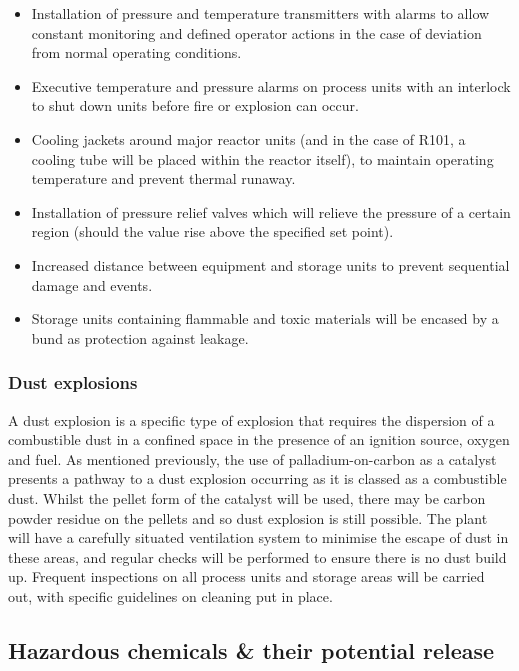\begin{itemize}
\item Installation of pressure and temperature transmitters with alarms to allow constant monitoring and defined operator actions in the case of deviation from normal operating conditions.
         \item Executive temperature and pressure alarms on process units with an interlock to shut down units before fire or explosion can occur. 
         \item Cooling jackets around major reactor units (and in the case of R101, a cooling tube will be placed within the reactor itself), to maintain operating temperature and prevent thermal runaway.
          \item Installation of pressure relief valves which will relieve the pressure of a certain region (should the value rise above the specified set point).
    \item Increased distance between equipment and storage units to prevent sequential damage and events.
    \item Storage units containing flammable and toxic materials will be encased by a bund as protection against leakage.
\end{itemize}


\subsubsection{Dust explosions}

A dust explosion is a specific type of explosion that requires the dispersion of a combustible dust in a confined space in the presence of an ignition source, oxygen and fuel. As mentioned previously, the use of palladium-on-carbon as a catalyst presents a pathway to a dust explosion occurring as it is classed as a combustible dust. Whilst the pellet form of the catalyst will be used, there may be carbon powder residue on the pellets and so dust explosion is still possible. The plant will have a carefully situated ventilation system to minimise the escape of dust in these areas, and regular checks will be performed to ensure there is no dust build up.
Frequent inspections on all process units and storage areas will be carried out, with specific guidelines on cleaning put in place. 

\subsection{Hazardous chemicals \& their potential release}

